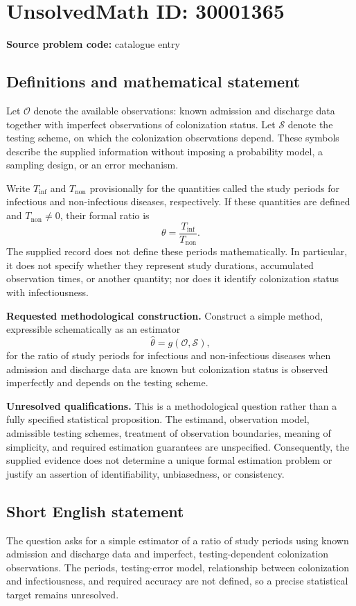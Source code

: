 \documentclass[11pt]{article}
\begin{document}
\section*{UnsolvedMath ID: 30001365}
\textbf{Source problem code:} catalogue entry
\subsection{Definitions and mathematical statement}
Let \(\mathcal O\) denote the available observations: known admission and discharge data together with imperfect observations of colonization status. Let \(\mathcal S\) denote the testing scheme, on which the colonization observations depend. These symbols describe the supplied information without imposing a probability model, a sampling design, or an error mechanism.

Write \(T_{\mathrm{inf}}\) and \(T_{\mathrm{non}}\) provisionally for the quantities called the study periods for infectious and non-infectious diseases, respectively. If these quantities are defined and \(T_{\mathrm{non}}\ne 0\), their formal ratio is
\[
\theta=\frac{T_{\mathrm{inf}}}{T_{\mathrm{non}}}.
\]
The supplied record does not define these periods mathematically. In particular, it does not specify whether they represent study durations, accumulated observation times, or another quantity; nor does it identify colonization status with infectiousness.

\textbf{Requested methodological construction.} Construct a simple method, expressible schematically as an estimator
\[
\widehat\theta=g(\mathcal O,\mathcal S),
\]
for the ratio of study periods for infectious and non-infectious diseases when admission and discharge data are known but colonization status is observed imperfectly and depends on the testing scheme.

\textbf{Unresolved qualifications.} This is a methodological question rather than a fully specified statistical proposition. The estimand, observation model, admissible testing schemes, treatment of observation boundaries, meaning of simplicity, and required estimation guarantees are unspecified. Consequently, the supplied evidence does not determine a unique formal estimation problem or justify an assertion of identifiability, unbiasedness, or consistency.
\subsection{Short English statement}
The question asks for a simple estimator of a ratio of study periods using known admission and discharge data and imperfect, testing-dependent colonization observations. The periods, testing-error model, relationship between colonization and infectiousness, and required accuracy are not defined, so a precise statistical target remains unresolved.
\end{document}
